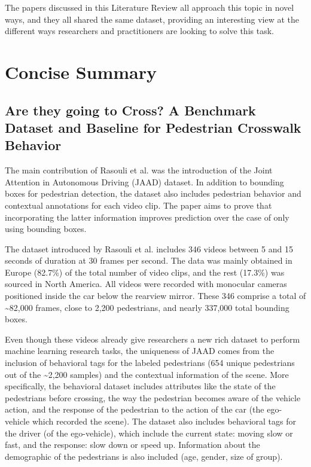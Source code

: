 \documentclass[conference, onecolumn]{IEEEtran}
\begin{document}
The papers discussed in this Literature Review all approach this topic in novel ways, and they all shared the same dataset, providing an interesting view at the different ways researchers and practitioners are looking to solve this task.

\section{Concise Summary}\label{sec:summary}
\subsection{Are they going to Cross? A Benchmark Dataset and Baseline for Pedestrian Crosswalk Behavior}\label{are-they-going-to-cross-a-benchmark-dataset-and-baseline-for-pedestrian-crosswalk-behavior-rasouli2017iccvw}
The main contribution of Rasouli et al. was the introduction of the Joint Attention in Autonomous Driving (JAAD) dataset. In addition to bounding boxes for pedestrian detection, the dataset also includes pedestrian behavior and contextual annotations for each video clip. The paper aims to prove that incorporating the latter information improves prediction over the case of only using bounding boxes.

The dataset introduced by Rasouli et al. includes 346 videos between 5 and 15 seconds of duration at 30 frames per second. The data was mainly obtained in Europe (82.7\%) of the total number of video clips, and the rest (17.3\%) was sourced in North America. All videos were recorded with monocular cameras positioned inside the car below the rearview mirror. These 346 comprise a total of \textasciitilde82,000 frames, close to 2,200 pedestrians, and nearly 337,000 total bounding boxes.

Even though these videos already give researchers a new rich dataset to perform machine learning research tasks, the uniqueness of JAAD comes from the inclusion of behavioral tags for the labeled pedestrians (654 unique pedestrians out of the \textasciitilde2,200 samples) and the contextual information of the scene. More specifically, the behavioral
dataset includes attributes like the state of the pedestrians before crossing, the way the pedestrian becomes aware of the vehicle action, and the response of the pedestrian to the action of the car (the ego-vehicle which recorded the scene). The dataset also includes behavioral tags for the driver (of the ego-vehicle), which include the current state: moving slow or fast, and the response: slow down or speed up. Information about the demographic of the pedestrians is also included (age, gender, size of group).
\end{document}
